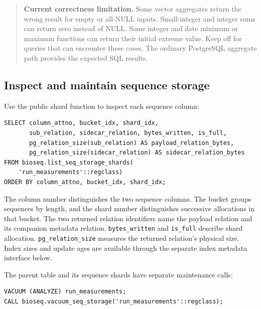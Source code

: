 \begin{quote}
\textbf{Current correctness limitation.}
Some vector aggregates return the wrong result for empty or all-NULL
inputs. Small-integer and integer sums can return zero instead of NULL.
Some integer and date minimum or maximum functions can return their
initial extreme value. Keep  off for
queries that can encounter these cases. The ordinary PostgreSQL aggregate
path provides the expected SQL results.
\end{quote}

\subsection{Inspect and maintain sequence storage}

Use the public shard function to inspect each sequence column:

\par\noindent\begin{minipage}{\linewidth}
\begin{lstlisting}[style=bioseq-appendix-sql,
  caption={Inspect payload shards and their companion relations.}]
SELECT column_attno, bucket_idx, shard_idx,
       sub_relation, sidecar_relation, bytes_written, is_full,
       pg_relation_size(sub_relation) AS payload_relation_bytes,
       pg_relation_size(sidecar_relation) AS sidecar_relation_bytes
FROM bioseq.list_seq_storage_shards(
    'run_measurements'::regclass)
ORDER BY column_attno, bucket_idx, shard_idx;
\end{lstlisting}
\end{minipage}

The column number distinguishes the two sequence columns. The bucket
groups sequences by length, and the shard number distinguishes successive
allocations in that bucket. The two returned relation identifiers name
the payload relation and its companion metadata relation.
\texttt{bytes\_written} and \texttt{is\_full} describe shard allocation.
\texttt{pg\_relation\_size} measures the returned relation's physical size.
Index sizes and update ages are available through the separate index
metadata interface below.

The parent table and its sequence shards have separate maintenance calls:

\par\noindent\begin{minipage}{\linewidth}
\begin{lstlisting}[style=bioseq-appendix-sql,
  caption={Maintain the parent table and allocated sequence shards.}]
VACUUM (ANALYZE) run_measurements;
CALL bioseq.vacuum_seq_storage('run_measurements'::regclass);
\end{lstlisting}
\end{minipage}

